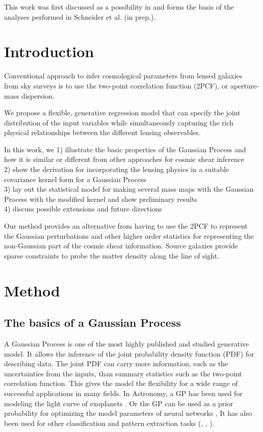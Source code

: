  
This work was first discussed as a possibility in  \citep{Schneider2014}  and 
forms the basis of the analyses performed in Schneider et al. (in prep.).

\section{Introduction} 
Conventional approach to infer cosmological parameters from lensed galaxies
from sky surveys is to use the 
two-point correlation function (2PCF), or aperture-mass dispersion.

We propose a flexible, generative regression model    
that can specify the joint distribution of the input variables while 
simultaneously capturing the rich physical relationships between the different
lensing observables.  

In this work, we 
1) illustrate the basic properties of the Gaussian Process and how it is
similar or different from other approaches for cosmic shear inference  \\ 
2) show the derivation for incorporating the lensing physics in 
a suitable covariance kernel form for a Gaussian Process  \\
3) lay out the statistical model for making several mass maps 
with the Gaussian Process with the modified kernel and show preliminary results \\ 
4) discuss possible extensions and future directions 
 
Our method provides an alternative from having to use the 2PCF to represent the
Gaussian perturbations and other higher order
statistics for representing the non-Gaussian part of the cosmic shear information. 
Source galaxies provide sparse constraints to probe the matter density along
the line of sight. 

\section{Method}
\subsection{The basics of a Gaussian Process}
A Gaussian Process is one of the most highly published and studied 
generative model. It allows the inference of the joint probability density 
function (PDF) for describing data. The joint PDF can carry more information,
such as the uncertainties from the inputs, 
than summary statistics such as the two-point correlation function.
This gives the model the flexibility for a wide range
of successful applications in many fields. 
In Astronomy, a GP has been used for modeling 
the light curve of exoplanets \citep{Ambikasaran2014a}.
Or the GP can be used as a prior probability 
for optimizing the model parameters of
neural networks \citep{Snoek2012}, 
It has also been used for other classification and pattern extraction tasks 
(\citealt{Wilson2013}, \citealt{Duvenaud2013}, \citealt{Rasmussen2006}).
 
